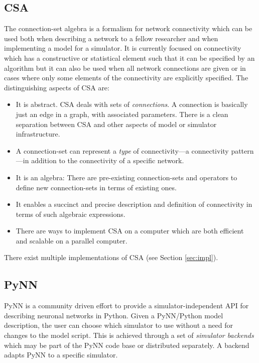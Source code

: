 \documentclass{frontiersSCNS} %
\begin{document}
\subsection{CSA}
The connection-set algebra \citep[CSA;][]{djurfeldt12} is a formalism
for network connectivity which can be used both when describing a
network to a fellow researcher and when implementing a model for a
simulator.  It is currently focused on connectivity which has a
constructive or statistical element such that it can be specified by
an algorithm but it can also be used when all network connections are
given or in cases where only some elements of the connectivity are
explicitly specified. The distinguishing aspects of CSA are:
\begin{itemize}
\item It is abstract. CSA deals with sets of \emph{connections}. A
  connection is basically just an edge in a graph, with associated
  parameters. There is a clean separation between CSA and other
  aspects of model or simulator infrastructure.
\item A connection-set can represent a \emph{type} of
  connectivity---a connectivity pattern---in addition to the connectivity
  of a specific network.
\item It is an algebra: There are pre-existing connection-sets and
  operators to define new connection-sets in terms of existing ones.
\item It enables a succinct and precise description and definition of
  connectivity in terms of such algebraic expressions.
\item There are ways to implement CSA on a computer which are both
  efficient and scalable on a parallel computer.
\end{itemize}
There exist multiple implementations of CSA (see Section
\ref{sec:impl}).

\subsection{PyNN}\label{sec:pynn}

PyNN \citep[\url{http://www.neuralensemble.org/PyNN};][]{Davison09} is
a community driven effort to provide a simulator-independent API for
describing neuronal networks in Python. Given a PyNN/Python model
description, the user can choose which simulator to use without a need
for changes to the model script. This is achieved through a set of
\emph{simulator backends} which may be part of the PyNN code base or
distributed separately. A backend adapts PyNN to a specific simulator.
\end{document}
